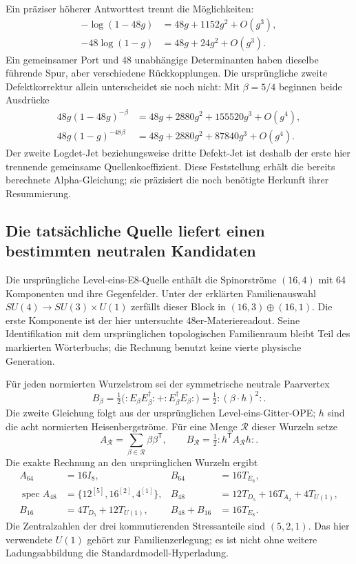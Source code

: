 Ein präziser höherer Antworttest trennt die Möglichkeiten:
\begin{align}
-\log(1-48g)&=48g+1152g^2+O(g^3),\\
-48\log(1-g)&=48g+24g^2+O(g^3).
\end{align}
Ein gemeinsamer Port und 48 unabhängige Determinanten haben dieselbe führende Spur, aber verschiedene Rückkopplungen. Die ursprüngliche zweite Defektkorrektur allein unterscheidet sie noch nicht: Mit $\beta=5/4$ beginnen beide Ausdrücke
\begin{align}
48g(1-48g)^{-\beta}&=48g+2880g^2+155520g^3+O(g^4),\\
48g(1-g)^{-48\beta}&=48g+2880g^2+87840g^3+O(g^4).
\end{align}
Der zweite Logdet-Jet beziehungsweise dritte Defekt-Jet ist deshalb der erste hier trennende gemeinsame Quellenkoeffizient. Diese Feststellung erhält die bereits berechnete Alpha-Gleichung; sie präzisiert die noch benötigte Herkunft ihrer Resummierung.

\subsection{Die tatsächliche Quelle liefert einen bestimmten neutralen Kandidaten}\label{sec:neutralfield}
Die ursprüngliche Level-eins-E8-Quelle enthält die Spinorströme $(16,4)$ mit 64 Komponenten und ihre Gegenfelder. Unter der erklärten Familienauswahl $SU(4)\to SU(3)\times U(1)$ zerfällt dieser Block in $(16,3)\oplus(16,1)$. Die erste Komponente ist der hier untersuchte 48er-Materiereadout. Seine Identifikation mit dem ursprünglichen topologischen Familienraum bleibt Teil des markierten Wörterbuchs; die Rechnung benutzt keine vierte physische Generation.

Für jeden normierten Wurzelstrom sei der symmetrische neutrale Paarvertex
\begin{equation}
B_\beta=\tfrac12\bigl(:E_\beta E_\beta^\dagger:
 +:E_\beta^\dagger E_\beta:\bigr)
=\tfrac12:(\beta\cdot h)^2:.
\end{equation}
Die zweite Gleichung folgt aus der ursprünglichen Level-eins-Gitter-OPE; $h$ sind die acht normierten Heisenbergströme. Für eine Menge $\mathcal R$ dieser Wurzeln setze
\begin{equation}
A_{\mathcal R}=\sum_{\beta\in\mathcal R}\beta\beta^{\mathsf T},\qquad
B_{\mathcal R}=\tfrac12:h^{\mathsf T}A_{\mathcal R}h:.
\end{equation}
Die exakte Rechnung an den ursprünglichen Wurzeln ergibt
\begin{align}
A_{64}&=16I_8,& B_{64}&=16T_{E_8},\\
\operatorname{spec}A_{48}&=\{12^{[5]},16^{[2]},4^{[1]}\},&
B_{48}&=12T_{D_5}+16T_{A_2}+4T_{U(1)},\\
B_{16}&=4T_{D_5}+12T_{U(1)},&
B_{48}+B_{16}&=16T_{E_8}.
\end{align}
Die Zentralzahlen der drei kommutierenden Stressanteile sind $(5,2,1)$. Das hier verwendete $U(1)$ gehört zur Familienzerlegung; es ist nicht ohne weitere Ladungsabbildung die Standardmodell-Hyperladung.

